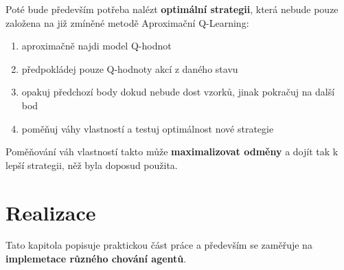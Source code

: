 Poté bude především potřeba nalézt \textbf{optimální strategii}, která nebude pouze založena na již zmíněné metodě Aproximační Q-Learning:
\begin{enumerate}
\item aproximačně najdi model Q-hodnot
\item předpokládej pouze Q-hodnoty akcí z daného stavu
\item opakuj předchozí body dokud nebude dost vzorků, jinak pokračuj na další bod
\item poměňuj váhy vlastností a testuj optimálnost nové strategie
\end{enumerate}
Poměňování váh vlastností takto může \textbf{maximalizovat odměny} a dojít tak k lepší strategii, něž byla doposud použita.

\chapter{Realizace}
Tato kapitola popisuje praktickou část práce a především se zaměřuje na \textbf{implemetace různého chování agentů}.

